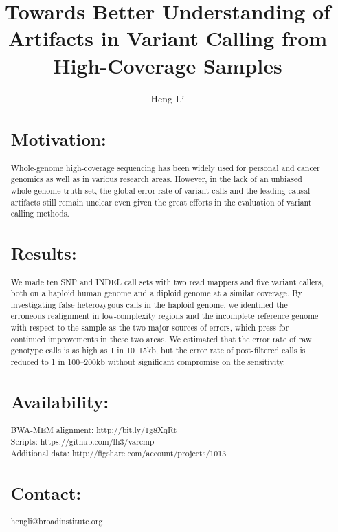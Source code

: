 \documentclass{bioinfo}
\begin{document}

\title[Artifacts in variant calling]{Towards Better Understanding of Artifacts in Variant Calling from High-Coverage Samples}
\author[Li]{Heng Li}

\address{Broad Institute of Harvard and MIT, 7 Cambridge Center, Cambridge, MA 02142, USA}

\maketitle

\begin{abstract}

\section{Motivation:} Whole-genome high-coverage sequencing has been widely
used for personal and cancer genomics as well as in various research areas.
However, in the lack of an unbiased whole-genome truth set, the global error
rate of variant calls and the leading causal artifacts still remain unclear
even given the great efforts in the evaluation of variant calling methods.

\section{Results:} We made ten SNP and INDEL call sets with two read mappers
and five variant callers, both on a haploid human genome and a diploid genome
at a similar coverage. By investigating false heterozygous calls in the haploid
genome, we identified the erroneous realignment in low-complexity regions and
the incomplete reference genome with respect to the sample as the two major
sources of errors, which press for continued improvements in these two areas.
We estimated that the error rate of raw genotype calls is as high as 1 in
10--15kb, but the error rate of post-filtered calls is reduced to 1 in
100--200kb without significant compromise on the sensitivity.

\section{Availability:} BWA-MEM alignment: http://bit.ly/1g8XqRt\\
Scripts: https://github.com/lh3/varcmp\\
Additional data: http://figshare.com/account/projects/1013

\section{Contact:} hengli@broadinstitute.org

\end{abstract}
\end{document}
